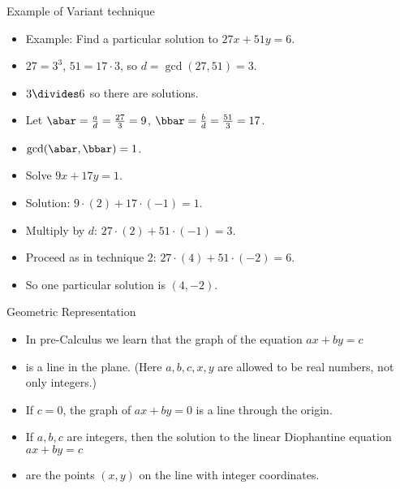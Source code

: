 \documentclass{beamer}
\begin{document}
\begin{frame}{Example of Variant technique}
\begin{itemize}
  \item Example: Find a particular solution to $27x + 51y = 6$.
  \item $27=3^3$, $51 =17 \cdot 3$, so $d = \gcd(27, 51) = 3$.
  \item $3\divides 6$ so there are solutions.
  \item Let $\abar=\frac{a}{d} = \frac{27}{3} = 9$, $\bbar=\frac{b}{d} = \frac{51}{3} = 17$.
  \item $\gcd(\abar,\bbar)=1$. \item Solve $9x + 17y = 1$.
  \item Solution: $9 \cdot (2) + 17 \cdot (-1) = 1$.
  \item Multiply by $d$: $27\cdot (2) + 51 \cdot (-1) = 3$.
  \item Proceed as in technique 2: $27\cdot (4) + 51 \cdot (-2) = 6$.
  \item So one particular solution is $(4,-2)$.
\end{itemize}

\end{frame}




\begin{frame}{Geometric Representation}

\begin{itemize}
  \item In pre-Calculus we learn that the graph of the equation $ax+by = c$
  \item is a line in the plane. (Here $a,b,c,x,y$ are allowed to be real numbers, not only integers.)
  \item If $c=0$, the graph of $ax+by=0$ is a line through the origin.
  \item If $a,b,c$ are integers, then the solution to the linear Diophantine equation $ax+by=c$
  \item are the points $(x,y)$ on the line with integer coordinates.
\end{itemize}

\end{frame}
\end{document}
